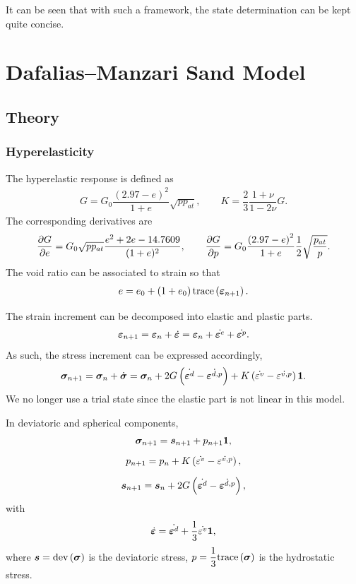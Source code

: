It can be seen that with such a framework, the state determination can be kept quite concise.
\section{Dafalias--Manzari Sand Model}
\subsection{Theory}
\subsubsection{Hyperelasticity}
The hyperelastic response is defined as
\begin{gather}
G=G_0\dfrac{\left(2.97-e\right)^2}{1+e}\sqrt{pp_{at}},\qquad
K=\dfrac{2}{3}\dfrac{1+\nu}{1-2\nu}G.
\end{gather}
The corresponding derivatives are
\begin{gather}
\dfrac{\partial{G}}{\partial{e}}=G_0\sqrt{pp_{at}}\dfrac{e^2+2e-14.7609}{(1+e)^2},\qquad
\dfrac{\partial{G}}{\partial{p}}=G_0\dfrac{\left(2.97-e\right)^2}{1+e}\dfrac{1}{2}\sqrt{\dfrac{p_{at}}{p}}.
\end{gather}
The void ratio can be associated to strain so that
\begin{gather}
e=e_0+\left(1+e_0\right)\text{trace}\left(\bm{\varepsilon}_{n+1}\right).
\end{gather}

The strain increment can be decomposed into elastic and plastic parts.
\begin{gather}
\bm{\varepsilon}_{n+1}=\bm{\varepsilon}_n+\dot{\bm{\varepsilon}}=\bm{\varepsilon}_n+\dot{\bm{\varepsilon}^{e}}+\dot{\bm{\varepsilon}^{p}}.
\end{gather}
As such, the stress increment can be expressed accordingly,
\begin{gather}
\bm{\sigma}_{n+1}=\bm{\sigma}_n+\dot{\bm{\sigma}}=\bm{\sigma}_n+2G\left(\dot{\bm{\varepsilon}^d}-\dot{\bm{\varepsilon}^{d,p}}\right)+K\left(\dot{\varepsilon^v}-\dot{\varepsilon^{v,p}}\right)\bm{1}.
\end{gather}
We no longer use a trial state since the elastic part is not linear in this model.

In deviatoric and spherical components,
\begin{gather}
\bm{\sigma}_{n+1}=\bm{s}_{n+1}+p_{n+1}\bm{1},\\[2mm]
p_{n+1}=p_n+K\left(\dot{\varepsilon^v}-\dot{\varepsilon^{v,p}}\right),\\[2mm]
\bm{s}_{n+1}=\bm{s}_n+2G\left(\dot{\bm{\varepsilon}^d}-\dot{\bm{\varepsilon}^{d,p}}\right),
\end{gather}
with
\begin{gather}
\dot{\bm{\varepsilon}}=\dot{\bm{\varepsilon}^d}+\dfrac{1}{3}\dot{\varepsilon^v}\bm{1},
\end{gather}
where $\bm{s}=\text{dev}\left(\bm{\sigma}\right)$ is the deviatoric stress, $p=\dfrac{1}{3}\text{trace}\left(\bm{\sigma}\right)$ is the hydrostatic stress.
